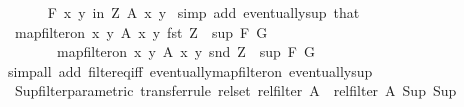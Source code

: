 \begin{isabellebody}
\ \ \ \ \isamarkupfalse%
\ {\isachardoublequoteopen}{\isasymforall}\isactrlsub F\ {\isacharparenleft}{\kern0pt}x{\isacharcomma}{\kern0pt}\ y{\isacharparenright}{\kern0pt}\ in\ {\isacharquery}{\kern0pt}Z{\isachardot}{\kern0pt}\ A\ x\ y{\isachardoublequoteclose}\ \isamarkupfalse%
{\isacharparenleft}{\kern0pt}simp\ add{\isacharcolon}{\kern0pt}\ eventually{\isacharunderscore}{\kern0pt}sup\ that{\isacharparenright}{\kern0pt}\isanewline
\ \ \ \ \isamarkupfalse%
\ \isamarkupfalse%
\ {\isachardoublequoteopen}map{\isacharunderscore}{\kern0pt}filter{\isacharunderscore}{\kern0pt}on\ {\isacharbraceleft}{\kern0pt}{\isacharparenleft}{\kern0pt}x{\isacharcomma}{\kern0pt}\ y{\isacharparenright}{\kern0pt}{\isachardot}{\kern0pt}\ A\ x\ y{\isacharbraceright}{\kern0pt}\ fst\ {\isacharquery}{\kern0pt}Z\ {\isacharequal}{\kern0pt}\ sup\ {\isacharquery}{\kern0pt}F\ {\isacharquery}{\kern0pt}G{\isachardoublequoteclose}\ \isanewline
\ \ \ \ \ \ \ {\isachardoublequoteopen}map{\isacharunderscore}{\kern0pt}filter{\isacharunderscore}{\kern0pt}on\ {\isacharbraceleft}{\kern0pt}{\isacharparenleft}{\kern0pt}x{\isacharcomma}{\kern0pt}\ y{\isacharparenright}{\kern0pt}{\isachardot}{\kern0pt}\ A\ x\ y{\isacharbraceright}{\kern0pt}\ snd\ {\isacharquery}{\kern0pt}Z\ {\isacharequal}{\kern0pt}\ sup\ {\isacharquery}{\kern0pt}F{\isacharprime}{\kern0pt}\ {\isacharquery}{\kern0pt}G{\isacharprime}{\kern0pt}{\isachardoublequoteclose}\isanewline
\ \ \ \ \ \ \isamarkupfalse%
{\isacharparenleft}{\kern0pt}simp{\isacharunderscore}{\kern0pt}all\ add{\isacharcolon}{\kern0pt}\ filter{\isacharunderscore}{\kern0pt}eq{\isacharunderscore}{\kern0pt}iff\ eventually{\isacharunderscore}{\kern0pt}map{\isacharunderscore}{\kern0pt}filter{\isacharunderscore}{\kern0pt}on\ eventually{\isacharunderscore}{\kern0pt}sup{\isacharparenright}{\kern0pt}\isanewline
\ \ \isamarkupfalse%
\isanewline
{}\isamarkupfalse%
%
\endisatagproof
{\isafoldproof}%
%
\isadelimproof
\isanewline
%
\endisadelimproof
\isanewline
{}\isamarkupfalse%
\ Sup{\isacharunderscore}{\kern0pt}filter{\isacharunderscore}{\kern0pt}parametric\ {\isacharbrackleft}{\kern0pt}transfer{\isacharunderscore}{\kern0pt}rule{\isacharbrackright}{\kern0pt}{\isacharcolon}{\kern0pt}\ {\isachardoublequoteopen}{\isacharparenleft}{\kern0pt}rel{\isacharunderscore}{\kern0pt}set\ {\isacharparenleft}{\kern0pt}rel{\isacharunderscore}{\kern0pt}filter\ A{\isacharparenright}{\kern0pt}\ {\isacharequal}{\kern0pt}{\isacharequal}{\kern0pt}{\isacharequal}{\kern0pt}{\isachargreater}{\kern0pt}\ rel{\isacharunderscore}{\kern0pt}filter\ A{\isacharparenright}{\kern0pt}\ Sup\ Sup{\isachardoublequoteclose}\isanewline

\end{isabellebody}
